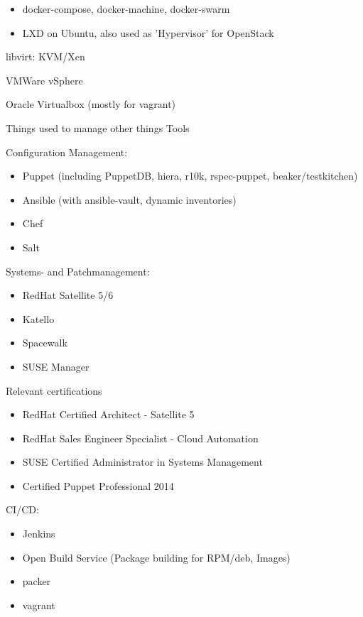 \begin{cventries}
{\begin{cvitems}
          \begin{itemize}
            \item docker-compose, docker-machine, docker-swarm
            \item LXD on Ubuntu, also used as 'Hypervisor' for OpenStack
          \end{itemize}
        \item libvirt: KVM/Xen
        \item VMWare vSphere
        \item Oracle Virtualbox (mostly for vagrant)
      \end{cvitems}
    }
  \cventry
    {Things used to manage other things}
    {Tools}
    {}
    {}
    {
      \begin{cvitems}
        \item Configuration Management:
          \begin{itemize}
            \item Puppet (including PuppetDB, hiera, r10k, rspec-puppet, beaker/testkitchen)
            \item Ansible (with ansible-vault, dynamic inventories)
            \item Chef
            \item Salt
          \end{itemize}
        \item Systems- and Patchmanagement:
        \begin{itemize}
          \item RedHat Satellite 5/6
          \item Katello
          \item Spacewalk
          \item SUSE Manager
        \end{itemize}
        \item Relevant certifications
          \begin{itemize}
            \item RedHat Certified Architect - Satellite 5
            \item RedHat Sales Engineer Specialist - Cloud Automation
            \item SUSE Certified Administrator in Systems Management
            \item Certified Puppet Professional 2014
          \end{itemize}
      \item CI/CD:
        \begin{itemize}
          \item Jenkins
          \item Open Build Service (Package building for RPM/deb, Images)
          \item packer
          \item vagrant
        \end{itemize}
      \end{cvitems}
    }


\end{cventries}
